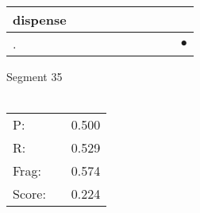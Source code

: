 \documentclass[landscape]{article}
\newcommand{\ssp}{\hspace{2pt}}
\newcommand{\mex}{\cellcolor{g}$\bullet$}
\begin{document}
\begin{tabular}{|l|p{10pt}|p{10pt}|p{10pt}|p{10pt}|p{10pt}|p{10pt}|p{10pt}|p{10pt}|p{10pt}|}
\hline
\ssp dispense \ssp&\hspace{2pt}&\hspace{2pt}&\hspace{2pt}&\hspace{2pt}&\hspace{2pt}&\hspace{2pt}&\hspace{2pt}&\hspace{2pt}&\hspace{2pt}\\
\hline
\ssp \cellcolor{ref8}. \ssp&\hspace{2pt}&\hspace{2pt}&\hspace{2pt}&\hspace{2pt}&\hspace{2pt}&\hspace{2pt}&\hspace{2pt}&\hspace{2pt}&\hspace{2pt}\mex\\
\hline
\end{tabular}

\vspace{6pt}
\noindent Segment 35\\\\
\noindent\begin{tabular}{lm{12pt}r}
\hline
P:&&0.500\\
R:&&0.529\\
Frag:&&0.574\\
Score:&&0.224\\
\end{tabular}

\newpage
\end{document}
